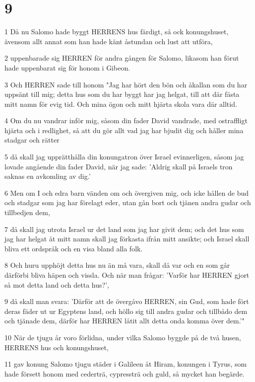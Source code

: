 \chapter{9}

\par 1 Då nu Salomo hade byggt HERRENS hus färdigt, så ock konungshuset, ävensom allt annat som han hade känt åstundan och lust att utföra,
\par 2 uppenbarade sig HERREN för andra gången för Salomo, likasom han förut hade uppenbarat sig för honom i Gibeon.
\par 3 Och HERREN sade till honom "Jag har hört den bön och åkallan som du har uppsänt till mig; detta hus som du har byggt har jag helgat, till att där fästa mitt namn för evig tid. Och mina ögon och mitt hjärta skola vara där alltid.
\par 4 Om du nu vandrar inför mig, såsom din fader David vandrade, med ostraffligt hjärta och i redlighet, så att du gör allt vad jag har bjudit dig och håller mina stadgar och rätter
\par 5 då skall jag upprätthålla din konungatron över Israel evinnerligen, såsom jag lovade angående din fader David, när jag sade: 'Aldrig skall på Israels tron saknas en avkomling av dig.'
\par 6 Men om I och edra barn vänden om och övergiven mig, och icke hållen de bud och stadgar som jag har förelagt eder, utan gån bort och tjänen andra gudar och tillbedjen dem,
\par 7 då skall jag utrota Israel ur det land som jag har givit dem; och det hus som jag har helgat åt mitt namn skall jag förkasta ifrån mitt ansikte; och Israel skall bliva ett ordspråk och en visa bland alla folk.
\par 8 Och huru upphöjt detta hus nu än må vara, skall då var och en som går därförbi bliva häpen och vissla. Och när man frågar: 'Varför har HERREN gjort så mot detta land och detta hus?',
\par 9 då skall man svara: 'Därför att de övergåvo HERREN, sin Gud, som hade fört deras fäder ut ur Egyptens land, och höllo sig till andra gudar och tillbådo dem och tjänade dem, därför har HERREN låtit allt detta onda komma över dem.'"
\par 10 När de tjugu år voro förlidna, under vilka Salomo byggde på de två husen, HERRENS hus och konungshuset,
\par 11 gav konung Salomo tjugu städer i Galileen åt Hiram, konungen i Tyrus, som hade försett honom med cederträ, cypressträ och guld, så mycket han begärde.
